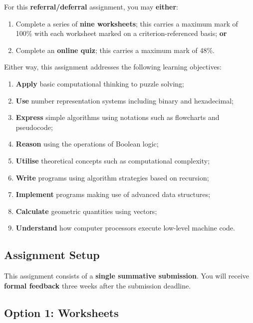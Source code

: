 \documentclass{../../fal_assignment}
\begin{document}
\begin{tcolorbox}
	For this \textbf{referral/deferral} assignment, you may \textbf{either}:
	\begin{enumerate}
		\item Complete a series of \textbf{nine worksheets}; this carries a maximum mark of 100\%
			with each worksheet marked on a criterion-referenced basis; \textbf{or}
		\item Complete an \textbf{online quiz}; this carries a maximum mark of 48\%.
	\end{enumerate}
\end{tcolorbox}

Either way, this assignment addresses the following learning objectives:
\begin{enumerate}
	\item \textbf{Apply} basic computational thinking to puzzle solving;
	\item \textbf{Use} number representation systems including binary and hexadecimal;
	\item \textbf{Express} simple algorithms using notations such as flowcharts and pseudocode;
	\item \textbf{Reason} using the operations of Boolean logic;
	\item \textbf{Utilise} theoretical concepts such as computational complexity;
	\item \textbf{Write} programs using algorithm strategies based on recursion;
	\item \textbf{Implement} programs making use of advanced data structures;
	\item \textbf{Calculate} geometric quantities using vectors;
	\item \textbf{Understand} how computer processors execute low-level machine code.
\end{enumerate}

\subsection*{Assignment Setup}

This assignment consists of a \textbf{single summative submission}.
You will receive \textbf{formal feedback} three weeks after the submission deadline.

\subsection*{Option 1: Worksheets}
\end{document}
